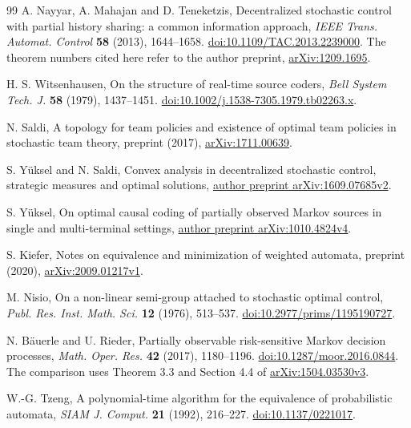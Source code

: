 \begin{thebibliography}{99}
A. Nayyar, A. Mahajan and D. Teneketzis,
Decentralized stochastic control with partial history sharing:
a common information approach,
\emph{IEEE Trans. Automat. Control} \textbf{58} (2013), 1644--1658.
\href{https://doi.org/10.1109/TAC.2013.2239000}{doi:10.1109/TAC.2013.2239000}.
The theorem numbers cited here refer to the author preprint,
\href{https://arxiv.org/abs/1209.1695}{arXiv:1209.1695}.

H. S. Witsenhausen, On the structure of real-time source coders,
\emph{Bell System Tech. J.} \textbf{58} (1979), 1437--1451.
\href{https://doi.org/10.1002/j.1538-7305.1979.tb02263.x}{doi:10.1002/j.1538-7305.1979.tb02263.x}.


N. Saldi, A topology for team policies and existence of optimal team
policies in stochastic team theory, preprint (2017),
\href{https://arxiv.org/abs/1711.00639}{arXiv:1711.00639}.

S. Y\"uksel and N. Saldi, Convex analysis in decentralized stochastic
control, strategic measures and optimal solutions,
\href{https://arxiv.org/abs/1609.07685v2}{author preprint arXiv:1609.07685v2}.

S. Y\"uksel, On optimal causal coding of partially observed Markov
sources in single and multi-terminal settings,
\href{https://arxiv.org/abs/1010.4824v4}{author preprint arXiv:1010.4824v4}.

S. Kiefer, Notes on equivalence and minimization of weighted automata,
preprint (2020),
\href{https://arxiv.org/abs/2009.01217v1}{arXiv:2009.01217v1}.

M. Nisio, On a non-linear semi-group attached to stochastic optimal
control, \emph{Publ. Res. Inst. Math. Sci.} \textbf{12} (1976), 513--537.
\href{https://doi.org/10.2977/prims/1195190727}{doi:10.2977/prims/1195190727}.

N. B\"auerle and U. Rieder, Partially observable risk-sensitive Markov
decision processes, \emph{Math. Oper. Res.} \textbf{42} (2017), 1180--1196.
\href{https://doi.org/10.1287/moor.2016.0844}{doi:10.1287/moor.2016.0844}.
The comparison uses Theorem 3.3 and Section 4.4 of
\href{https://arxiv.org/abs/1504.03530v3}{arXiv:1504.03530v3}.

W.-G. Tzeng, A polynomial-time algorithm for the equivalence of
probabilistic automata, \emph{SIAM J. Comput.} \textbf{21} (1992), 216--227.
\href{https://doi.org/10.1137/0221017}{doi:10.1137/0221017}.



\end{thebibliography}
